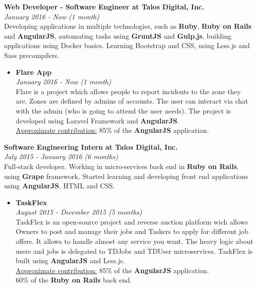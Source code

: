 \documentclass[margin, 10pt]{res} %
\begin{document}
\begin{resume}
\textbf{Web Developer - Software Engineer at Talos Digital, Inc.} \\
\textit{January 2016 - Now (1 month)} \\
Developing applications in multiple technologies, such as \textbf{Ruby}, \textbf{Ruby on Rails} and
\textbf{AngularJS}, automating tasks using \textbf{GruntJS} and \textbf{Gulp.js}, building
applications using Docker basics. Learning Bootstrap and CSS, using Less.js and Sass precompilers.
\begin{itemize}
  \item \textbf{Flare App} \\
        \textit{January 2016 - Now (1 month)} \\
        Flare is a project which allows people to report incidents to the zone they are. Zones are
        defined by admins of accounts. The user can interact via chat with the admin (who is going
        to attend the user needs). The project is developed using Laravel Framework and
        \textbf{AngularJS}. \\
        \underline{Approximate contribution:} 85\% of the \textbf{AngularJS} application. \\
\end{itemize}

\textbf{Software Engineering Intern at Talos Digital, Inc.} \\
\textit{July 2015 - January 2016 (6 months)} \\
Full-stack developer. Working in micro-services back end in \textbf{Ruby on Rails}, using
\textbf{Grape} framework. Started learning and developing front end applications using
\textbf{AngularJS}, HTML and CSS.

\begin{itemize}
  \item \textbf{TaskFlex} \\
        \textit{August 2015 - December 2015 (5 months)} \\
        TaskFlex is an open-source project and reverse auction platform wich allows Owners to post
        and manage their jobs and Taskers to apply for different job offers. It allows to handle
        almost any service you want. The heavy logic about users and jobs is delegated to TDJobs and
        TDUser microservices. TaskFlex is built using \textbf{AngularJS} and Less.js. \\
        \underline{Approximate contribution:} 85\% of the \textbf{AngularJS} application. \\
                                              60\% of the \textbf{Ruby on Rails} back end.


\end{itemize}
\end{resume}
\end{document}
